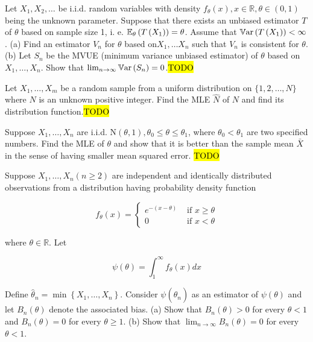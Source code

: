 \begin{example}
\label{exa:isi2006samplepsb9}Let $X_{1},X_{2},\ldots$ be i.i.d.
random variables with density $f_{\theta}(x),x\in\mathbb{R},\theta\in(0,1)$
being the unknown parameter. Suppose that there exists an unbiased
estimator $T$ of $\theta$ based on sample size 1, i. e. $\mathbb{E}_{\theta}\left(T\left(X_{1}\right)\right)=\theta$.
Assume that $\mathbb{V\mathrm{ar}}\left(T\left(X_{1}\right)\right)<\infty$. (a) Find
an estimator $V_{n}$ for $\theta$ based on$X_{1},\ldots X_{n}$
such that $V_{n}$ is consistent for $\theta$. (b) Let $S_{n}$ be
the MVUE (minimum variance unbiased estimator) of $\theta$ based
on $X_{1},\ldots,X_{n}$. Show that $\lim_{n\rightarrow\infty}\mathbb{V\mathrm{ar}}\left(S_{n}\right)=0$.\hl{TODO}
\end{example}

\begin{example}
\label{exa:isi2008samplepsb9}Let $X_{1},\ldots,X_{m}$ be a random
sample from a uniform distribution on $\{1,2,\ldots,N\}$ where $N$
is an unknown positive integer. Find the MLE $\widehat{N}$ of $N$
and find its distribution function.\hl{TODO}
\end{example}

\begin{example}
	\label{exa:isi2009samplepsb6}
	Suppose $X_1, \ldots, X_n$ are i.i.d. $\mathrm{N}(\theta, 1), \theta_0 \leq \theta \leq \theta_1$, where $\theta_0<\theta_1$ are two specified numbers. Find the MLE of $\theta$ and show that it is better than the sample mean $\bar{X}$ in the sense of having smaller mean squared error.
	\hl{TODO}
\end{example}

\begin{example}
	\label{exa:isi2023psb5}
	Suppose $X_1, \ldots, X_n(n \geq 2)$ are independent and identically distributed observations from a distribution having probability density function
	
	$$
	f_\theta(x)= \begin{cases}e^{-(x-\theta)} & \text { if } x \geq \theta \\ 0 & \text { if } x<\theta\end{cases}
	$$
	
	where $\theta \in \mathbb{R}$. Let
	
	$$
	\psi(\theta)=\int_1^{\infty} f_\theta(x) d x
	$$
	
	
	Define $\widehat{\theta}_n=\min \left\{X_1, \ldots, X_n\right\}$. Consider $\psi\left(\widehat{\theta}_n\right)$ as an estimator of $\psi(\theta)$ and let $B_n(\theta)$ denote the associated bias.
	(a) Show that $B_n(\theta)>0$ for every $\theta<1$ and $B_n(\theta)=0$ for every $\theta \geq 1$.
	(b) Show that $\lim _{n \rightarrow \infty} B_n(\theta)=0$ for every $\theta<1$.
\end{example}

